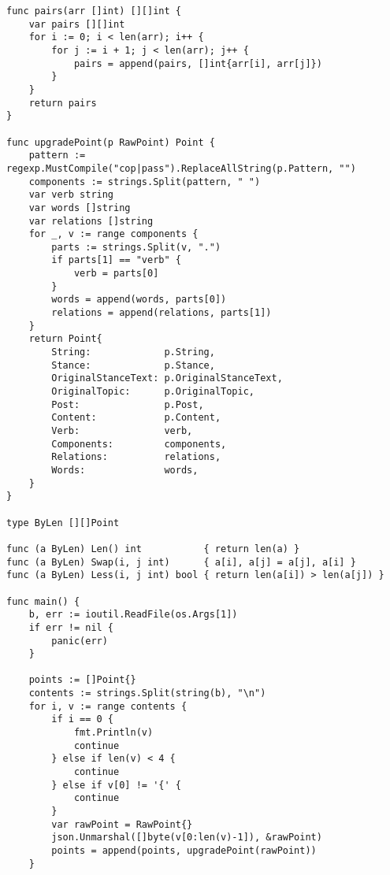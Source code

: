 \documentclass{article}
\begin{document}
\begin{verbatim}
func pairs(arr []int) [][]int {
	var pairs [][]int
	for i := 0; i < len(arr); i++ {
		for j := i + 1; j < len(arr); j++ {
			pairs = append(pairs, []int{arr[i], arr[j]})
		}
	}
	return pairs
}

func upgradePoint(p RawPoint) Point {
	pattern := regexp.MustCompile("cop|pass").ReplaceAllString(p.Pattern, "")
	components := strings.Split(pattern, " ")
	var verb string
	var words []string
	var relations []string
	for _, v := range components {
		parts := strings.Split(v, ".")
		if parts[1] == "verb" {
			verb = parts[0]
		}
		words = append(words, parts[0])
		relations = append(relations, parts[1])
	}
	return Point{
		String:             p.String,
		Stance:             p.Stance,
		OriginalStanceText: p.OriginalStanceText,
		OriginalTopic:      p.OriginalTopic,
		Post:               p.Post,
		Content:            p.Content,
		Verb:               verb,
		Components:         components,
		Relations:          relations,
		Words:              words,
	}
}

type ByLen [][]Point

func (a ByLen) Len() int           { return len(a) }
func (a ByLen) Swap(i, j int)      { a[i], a[j] = a[j], a[i] }
func (a ByLen) Less(i, j int) bool { return len(a[i]) > len(a[j]) }

func main() {
	b, err := ioutil.ReadFile(os.Args[1])
	if err != nil {
		panic(err)
	}

	points := []Point{}
	contents := strings.Split(string(b), "\n")
	for i, v := range contents {
		if i == 0 {
			fmt.Println(v)
			continue
		} else if len(v) < 4 {
			continue
		} else if v[0] != '{' {
			continue
		}
		var rawPoint = RawPoint{}
		json.Unmarshal([]byte(v[0:len(v)-1]), &rawPoint)
		points = append(points, upgradePoint(rawPoint))
	}


\end{verbatim}
\end{document}
